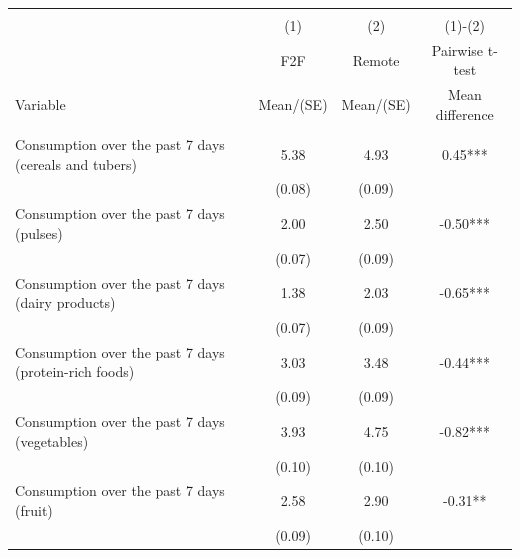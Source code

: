 
\begin{tabular}{@{\extracolsep{5pt}}lccc}
\\[-1.8ex]\hline \hline \\[-1.8ex]
 & \multicolumn{1}{c}{(1)}  & \multicolumn{1}{c}{(2)}  & \multicolumn{1}{c}{(1)-(2)} \\
 & \multicolumn{1}{c}{F2F}  & \multicolumn{1}{c}{Remote}  & \multicolumn{1}{c}{Pairwise t-test}  \\
Variable & Mean/(SE) & Mean/(SE) & Mean difference \\ \hline \\[-1.8ex] 
Consumption over the past 7 days (cereals and tubers)   & 5.38    & 4.93    & 0.45***   \\
 & (0.08)  & (0.09)  &  \\ [1ex]
Consumption over the past 7 days (pulses)   & 2.00    & 2.50    & -0.50***   \\
 & (0.07)  & (0.09)  &  \\ [1ex]
Consumption over the past 7 days (dairy products)   & 1.38    & 2.03    & -0.65***   \\
 & (0.07)  & (0.09)  &  \\ [1ex]
Consumption over the past 7 days (protein-rich foods)   & 3.03    & 3.48    & -0.44***   \\
 & (0.09)  & (0.09)  &  \\ [1ex]
Consumption over the past 7 days (vegetables)   & 3.93    & 4.75    & -0.82***   \\
 & (0.10)  & (0.10)  &  \\ [1ex]
Consumption over the past 7 days (fruit)   & 2.58    & 2.90    & -0.31**   \\
 & (0.09)  & (0.10)  &  \\ [1ex]

\end{tabular}
